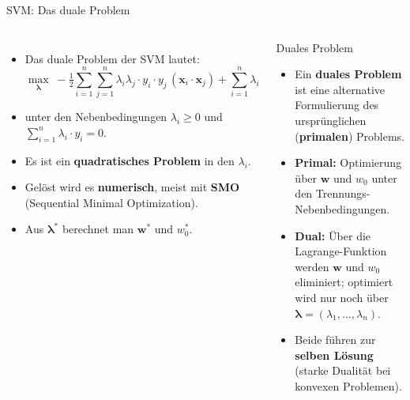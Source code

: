 \begin{frame}{SVM: Das duale Problem}
\begin{columns}

\footnotesize
\begin{itemize}
  \item Das duale Problem der SVM lautet:
        \[
          \max_{\boldsymbol{\lambda}} \; -\tfrac{1}{2}\sum_{i=1}^{n}\sum_{j=1}^{n}
          \lambda_i \lambda_j \cdot y_i \cdot y_j\,(\mathbf{x}_i\!\cdot\mathbf{x}_j)
          + \sum_{i=1}^{n}\lambda_i
        \]
  \item unter den Nebenbedingungen
        $\lambda_i \geq 0$ und
        $\sum_{i=1}^{n}\lambda_i \cdot y_i = 0$.
  \item Es ist ein \textbf{quadratisches Problem} in den $\lambda_i$.
  \item Gelöst wird es \textbf{numerisch}, meist mit \textbf{SMO}
        (Sequential Minimal Optimization).
  \item Aus $\boldsymbol{\lambda}^{*}$ berechnet man $\mathbf{w}^{*}$ und
        $w_0^{*}$.
\end{itemize}

\begin{blockDef}{\footnotesize Duales Problem}
\footnotesize
\begin{itemize}
  \item Ein \textbf{duales Problem} ist eine alternative Formulierung des
        ursprünglichen (\textbf{primalen}) Problems.
  \item \textbf{Primal:} Optimierung über $\mathbf{w}$ und $w_0$ unter den
        Trennungs-Nebenbedingungen.
  \item \textbf{Dual:} Über die Lagrange-Funktion werden $\mathbf{w}$ und
        $w_0$ eliminiert; optimiert wird nur noch über
        $\boldsymbol{\lambda} = (\lambda_1, \dots, \lambda_n)$.
  \item Beide führen zur \textbf{selben Lösung} (starke Dualität bei
        konvexen Problemen).
\end{itemize}
\end{blockDef}
\end{columns}
\end{frame}


